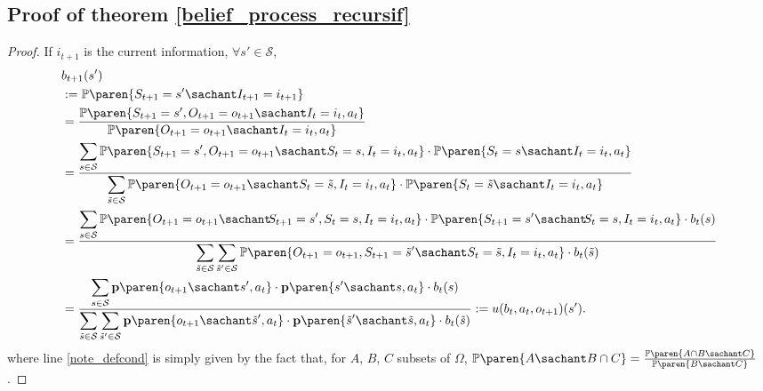 \subsection{Proof of theorem \ref{belief_process_recursif}}
\label{belief_process_recursif_RETURN}
\begin{proof}
If $i_{t+1}$ is the current information, $\forall s' \in \mathcal{S}$,
\begin{align}
\nonumber & b_{t+1}(s') \\
\nonumber	 		&:= \mathbb{P} \paren{ S_{t+1} = s' \sachant I_{t+1} = i_{t+1}} \\
\label{note_defcond}		&= \frac{ \mathbb{P} \paren{ S_{t+1} = s', O_{t+1}=o_{t+1} \sachant I_t=i_t,a_{t} }}{ 
\mathbb{P} \paren{ O_{t+1} = o_{t+1} \sachant I_t=i_t,a_{t}  } } \\
\nonumber		&= \frac{ \displaystyle \sum_{s \in \mathcal{S}} \mathbb{P} \paren{ S_{t+1} = s', O_{t+1}=o_{t+1} \sachant S_{t}=s,I_t=i_t,a_{t} } \cdot \mathbb{P} \paren{ S_t = s \sachant I_t=i_t,a_{t} }}{ 
\displaystyle \sum_{\tilde{s} \in \mathcal{S}} \mathbb{P} \paren{ O_{t+1} = o_{t+1} \sachant S_t = \tilde{s}, I_t=i_t,a_{t}  } \cdot \mathbb{P} \paren{ S_t = \tilde{s} \sachant I_t=i_t,a_{t} } } \\
\nonumber		&= \frac{ \displaystyle \sum_{s \in \mathcal{S}}  \mathbb{P} \paren{ O_{t+1} = o_{t+1} \sachant \hspace{-0.08cm} S_{t+1}=s', S_{t}=s,I_t=i_t,a_{t} } \cdot \mathbb{P} \paren{ S_{t+1} = s' \sachant \hspace{-0.08cm} S_{t}=s,I_t=i_t,a_{t} } \cdot b_t(s) }{ 
\displaystyle \sum_{\tilde{s} \in \mathcal{S}} \sum_{\tilde{s}' \in \mathcal{S}}  \mathbb{P} \paren{ O_{t+1} = o_{t+1}, S_{t+1}=\tilde{s}' \sachant S_t=\tilde{s}, I_t=i_t,a_{t}  } \cdot b_t(\tilde{s})  } \\
\nonumber	&= \frac{ \displaystyle \sum_{s \in \mathcal{S}}  \textbf{p} \paren{ o_{t+1} \sachant s', a_{t} } \cdot \textbf{p} \paren{ s' \sachant s,a_t } \cdot b_t(s) }{ 
\displaystyle \sum_{\tilde{s} \in \mathcal{S}} \sum_{\tilde{s}' \in \mathcal{S}} \textbf{p} \paren{ o_{t+1} \sachant \tilde{s}', a_{t} } \cdot \textbf{p} \paren{ \tilde{s}' \sachant \tilde{s},a_t } \cdot b_t(\tilde{s})  } := u(b_t,a_{t},o_{t+1})(s').
\end{align}
where line \ref{note_defcond} is simply given by the fact that, for $A$, $B$, $C$ subsets of $\Omega$, 
$\mathbb{P} \paren{ A \sachant B \cap C } = \frac{\mathbb{P} \paren{ A \cap B \sachant C }}{\mathbb{P} \paren{  B \sachant C }}$.
\end{proof}








